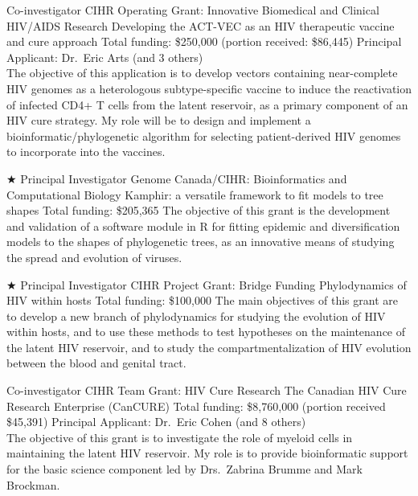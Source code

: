 {Co-investigator}
{CIHR Operating Grant: Innovative Biomedical and Clinical HIV/AIDS Research}
{Developing the ACT-VEC as an HIV therapeutic vaccine and cure approach}
{Total funding: \$250,000 (portion received: \$86,445)}
{
Principal Applicant: Dr.~Eric Arts (and 3 others)\\
The objective of this application is to develop vectors containing near-complete HIV genomes as a heterologous subtype-specific vaccine to induce the reactivation of infected CD4+ T cells from the latent reservoir, as a primary component of an HIV cure strategy.
My role will be to design and implement a bioinformatic/phylogenetic algorithm for selecting patient-derived HIV genomes to incorporate into the vaccines.\\
}


{$\bigstar$ Principal Investigator}  %
{Genome Canada/CIHR: Bioinformatics and Computational Biology}
{Kamphir: a versatile framework to fit models to tree shapes}
{Total funding: \$205,365}
{
The objective of this grant is the development and validation of a software module in R for fitting epidemic and diversification models to the shapes of phylogenetic trees, as an innovative means of studying the spread and evolution of viruses.\\
}



{$\bigstar$ Principal Investigator}
{CIHR Project Grant: Bridge Funding}  %
{Phylodynamics of HIV within hosts}
{Total funding: \$100,000}
{
The main objectives of this grant are to develop a new branch of phylodynamics for studying the evolution of HIV within hosts, and to use these methods to test hypotheses on the maintenance of the latent HIV reservoir, and to study the compartmentalization of HIV evolution between the blood and genital tract.\\
}



{Co-investigator}
{CIHR Team Grant: HIV Cure Research}
{The Canadian HIV Cure Research Enterprise (CanCURE)}
{Total funding: \$8,760,000 (portion received \$45,391)}
{
Principal Applicant: Dr.~Eric Cohen (and 8 others)\\
The objective of this grant is to investigate the role of myeloid cells in maintaining the latent HIV reservoir.
My role is to provide bioinformatic support for the basic science component led by Drs.~Zabrina Brumme and Mark Brockman.\\
}

